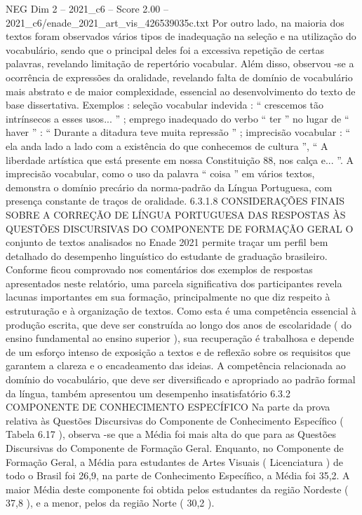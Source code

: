 \begin{textsample}{NEG Dim 2 – 2021\_c6 – Score 2.00 – 2021\_c6/enade\_2021\_art\_vis\_426539035c.txt}
Por outro lado, na maioria dos textos foram observados vários tipos de inadequação na seleção e na utilização do vocabulário, sendo que o principal deles foi a excessiva repetição de certas palavras, revelando limitação de repertório vocabular.
Além disso, observou -se a ocorrência de expressões da oralidade, revelando falta de domínio de vocabulário mais abstrato e de maior complexidade, essencial ao desenvolvimento do texto de base dissertativa.
Exemplos : seleção vocabular indevida : “ crescemos tão intrínsecos a esses usos... ” ; emprego inadequado do verbo “ ter ” no lugar de “ haver ” : “ Durante a ditadura teve muita repressão ” ; imprecisão vocabular : “ ela anda lado a lado com a existência do que conhecemos de cultura ”, “ A liberdade artística que está presente em nossa Constituição 88, nos calça e... ”.
A imprecisão vocabular, como o uso da palavra “ coisa ” em vários textos, demonstra o domínio precário da norma-padrão da Língua Portuguesa, com presença constante de traços de oralidade. 6.3.1.8 CONSIDERAÇÕES FINAIS SOBRE A CORREÇÃO DE LÍNGUA PORTUGUESA DAS RESPOSTAS ÀS QUESTÕES DISCURSIVAS DO COMPONENTE DE FORMAÇÃO GERAL O conjunto de textos analisados no Enade 2021 permite traçar um perfil bem detalhado do desempenho linguístico do estudante de graduação brasileiro.
Conforme ficou comprovado nos comentários dos exemplos de respostas apresentados neste relatório, uma parcela significativa dos participantes revela lacunas importantes em sua formação, principalmente no que diz respeito à estruturação e à organização de textos.
Como esta é uma competência essencial à produção escrita, que deve ser construída ao longo dos anos de escolaridade ( do ensino fundamental ao ensino superior ), sua recuperação é trabalhosa e depende de um esforço intenso de exposição a textos e de reflexão sobre os requisitos que garantem a clareza e o encadeamento das ideias.
A competência relacionada ao domínio do vocabulário, que deve ser diversificado e apropriado ao padrão formal da língua, também apresentou um desempenho insatisfatório 6.3.2 COMPONENTE DE CONHECIMENTO ESPECÍFICO Na parte da prova relativa às Questões Discursivas do Componente de Conhecimento Específico ( Tabela 6.17 ), observa -se que a Média foi mais alta do que para as Questões Discursivas do Componente de Formação Geral.
Enquanto, no Componente de Formação Geral, a Média para estudantes de Artes Visuais ( Licenciatura ) de todo o Brasil foi 26,9, na parte de Conhecimento Específico, a Média foi 35,2.
A maior Média deste componente foi obtida pelos estudantes da região Nordeste ( 37,8 ), e a menor, pelos da região Norte ( 30,2 ).

\end{textsample}
